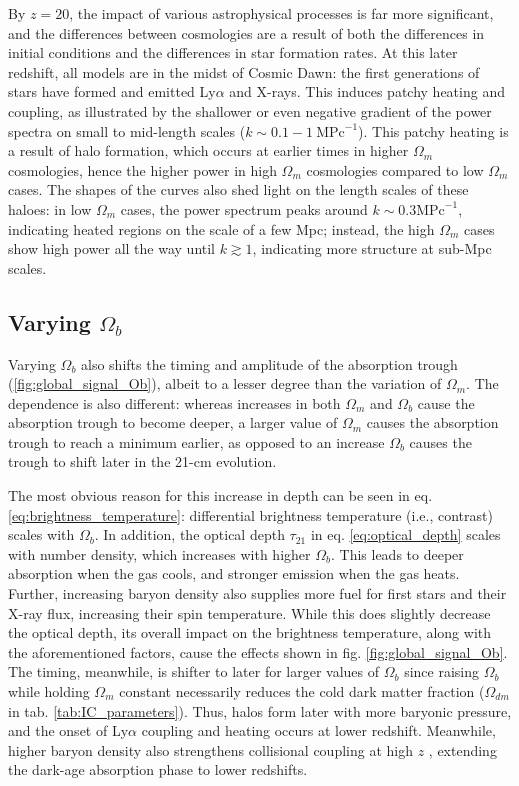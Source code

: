 \documentclass[floats,floatfix,showpacs,amssymb,prd,superscriptaddress,nofootinbib]{revtex4-2} %
\begin{document}
By $z = 20$, the impact of various astrophysical processes is far more significant, and the differences between cosmologies are a result of both the differences in initial conditions and the differences in star formation rates. At this later redshift, all models are in the midst of Cosmic Dawn: the first generations of stars have formed and emitted Ly$\alpha$ and X-rays. This induces patchy heating and coupling, as illustrated by the shallower or even negative gradient of the power spectra on small to mid-length scales ($k \sim 0.1 - 1 ~\text{MPc}^{-1}$). This patchy heating is a result of halo formation, which occurs at earlier times in higher $\Omega_m$ cosmologies, hence the higher power in high $\Omega_m$ cosmologies compared to low $\Omega_m$ cases. The shapes of the curves also shed light on the length scales of these haloes: in low $\Omega_m$ cases, the power spectrum peaks around $k \sim 0.3 \text{MPc}^{-1}$, indicating heated regions on the scale of a few Mpc; instead, the high $\Omega_m$ cases show high power all the way until $k \gtrsim 1$, indicating more structure at sub-Mpc scales. 


\subsection{Varying $\Omega_b$}

Varying $\Omega_b$ also shifts the timing and amplitude of the absorption trough (\ref{fig:global_signal_Ob}), albeit to a lesser degree than the variation of $\Omega_m$. The dependence is also different: whereas increases in both $\Omega_m$ and $\Omega_b$ cause the absorption trough to become deeper, a larger value of $\Omega_m$ causes the absorption trough to reach a minimum earlier, as opposed to an increase $\Omega_b$ causes the trough to shift later in the 21-cm evolution. 

The most obvious reason for this increase in depth can be seen in eq. \ref{eq:brightness_temperature}: differential brightness temperature (i.e., contrast) scales with $\Omega_b$. In addition, the optical depth $\tau_{21}$ in eq. \ref{eq:optical_depth} scales with number density, which increases with higher $\Omega_b$. This leads to deeper absorption when the gas cools, and stronger emission when the gas heats. Further, increasing baryon density also supplies more fuel for first stars and their X-ray flux, increasing their spin temperature. While this does slightly decrease the optical depth, its overall impact on the brightness temperature, along with the aforementioned factors, cause the effects shown in fig. \ref{fig:global_signal_Ob}. The timing, meanwhile, is shifter to later for larger values of $\Omega_b$ since raising $\Omega_b$ while holding $\Omega_m$ constant necessarily reduces the cold dark matter fraction ($\Omega_{dm}$ in tab. \ref{tab:IC_parameters}). Thus, halos form later with more baryonic pressure, and the onset of Ly$\alpha$ coupling and heating occurs at lower redshift. Meanwhile, higher baryon density also strengthens collisional coupling at high $z$ , extending the dark-age absorption phase to lower redshifts. 
\end{document}
